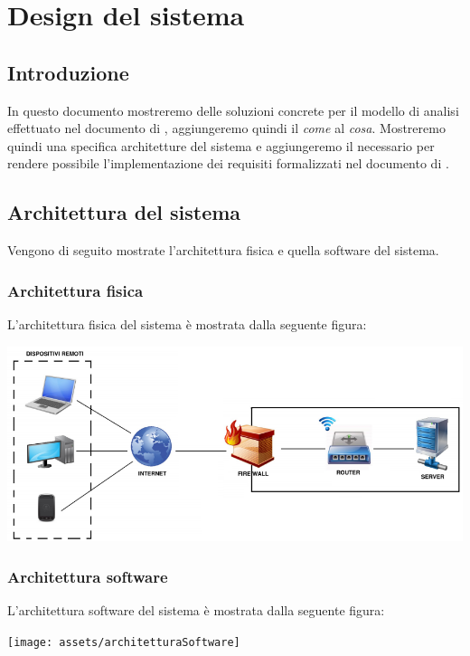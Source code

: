\chapter{Design del sistema}

\section{Introduzione}
In questo documento mostreremo delle soluzioni concrete per il modello di analisi effettuato nel documento di , aggiungeremo quindi il \emph{come} al \emph{cosa}. Mostreremo quindi una specifica architetture del sistema e aggiungeremo il necessario per rendere possibile l'implementazione dei requisiti formalizzati nel documento di .

\section{Architettura del sistema}
Vengono di seguito mostrate l'architettura fisica e quella software del sistema.

\subsection{Architettura fisica}
L'architettura fisica del sistema è mostrata dalla seguente figura:
\begin{center}
   \includegraphics[width=\textwidth]{assets/architetturaFisica}
\end{center}

\subsection{Architettura software}
L'architettura software del sistema è mostrata dalla seguente figura:
\begin{center}
   \texttt{[image: assets/architetturaSoftware]}
\end{center}

